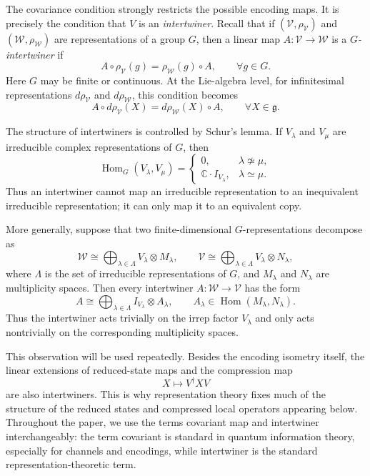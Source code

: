 \documentclass[10pt,twocolumn,superscriptaddress,aps,amsmath,amssymb,citeautoscript,floatfix,prx,longbibliography]{revtex4-2}
\newcounter{alg}
\theoremstyle{plain}
\theoremstyle{plain}
\theoremstyle{plain}
\theoremstyle{plain}
\theoremstyle{plain}
\theoremstyle{plain}
\begin{document}
The covariance condition strongly restricts the possible encoding maps. It is precisely the condition that $V$ is an \textit{intertwiner}. Recall that if $(\mathcal V,\rho_{\mathcal V})$ and $(\mathcal W,\rho_{\mathcal W})$ are representations of a group $G$, then a linear map $A:\mathcal V\to\mathcal W$ is a \textit{$G$-intertwiner} if
\begin{equation}\label{eq:intertwiner_def}
A\circ\rho_{\mathcal V}(g)
=
\rho_{\mathcal W}(g)\circ A,
\qquad
\forall g\in G .
\end{equation}
Here $G$ may be finite or continuous. At the Lie-algebra level, for infinitesimal representations $d\rho_{\mathcal V}$ and $d\rho_{\mathcal W}$, this condition becomes
$$
A\circ d\rho_{\mathcal V}(X)
=
d\rho_{\mathcal W}(X)\circ A,
\qquad
\forall X\in\mathfrak g .
$$

The structure of intertwiners is controlled by Schur's lemma. If $V_\lambda$ and $V_\mu$ are irreducible complex representations of $G$, then
$$
\operatorname{Hom}_G(V_\lambda,V_\mu)
=
\begin{cases}
0, & \lambda\not\simeq\mu,\\
\mathbb C\cdot I_{V_\lambda}, & \lambda\simeq\mu .
\end{cases}
$$
Thus an intertwiner cannot map an irreducible representation to an inequivalent irreducible representation; it can only map it to an equivalent copy.

More generally, suppose that two finite-dimensional $G$-representations decompose as
$$
\mathcal W
\cong
\bigoplus_{\lambda\in\Lambda}
V_\lambda\otimes M_\lambda,
\qquad
\mathcal V
\cong
\bigoplus_{\lambda\in\Lambda}
V_\lambda\otimes N_\lambda,
$$
where $\Lambda$ is the set of irreducible representations of $G$, and $M_\lambda$ and $N_\lambda$ are multiplicity spaces. Then every intertwiner $A:\mathcal W\to\mathcal V$ has the form
\begin{equation}\label{eq:intertwiner_decomp}
A
\cong
\bigoplus_{\lambda\in\Lambda}
I_{V_\lambda}\otimes A_\lambda,
\qquad
A_\lambda\in\operatorname{Hom}(M_\lambda,N_\lambda).
\end{equation}
Thus the intertwiner acts trivially on the irrep factor $V_\lambda$ and only acts nontrivially on the corresponding multiplicity spaces.

This observation will be used repeatedly. Besides the encoding isometry itself, the linear extensions of reduced-state maps and the compression map
$$
X
\longmapsto
V^\dagger X V
$$
are also intertwiners. This is why representation theory fixes much of the structure of the reduced states and compressed local operators appearing below. Throughout the paper, we use the terms covariant map and intertwiner interchangeably: the term covariant is standard in quantum information theory, especially for channels and encodings, while intertwiner is the standard representation-theoretic term.
\end{document}
